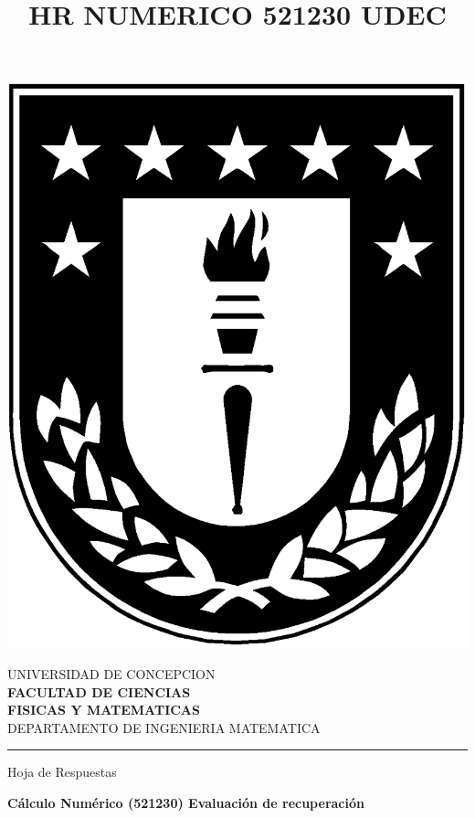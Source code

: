 \documentclass[11pt]{article}
\begin{document}
\title{HR NUMERICO 521230 UDEC}

\vspace*{-3cm}
\hspace{-3cm}
\begin{minipage}{0.12\textwidth}
\includegraphics[width=\textwidth]{logoudec.eps}
\end{minipage}
\hspace{5mm}
\begin{minipage}{0.9\textwidth}
UNIVERSIDAD DE CONCEPCION\\
{\small\small\bf 
FACULTAD DE CIENCIAS\\ 
FISICAS Y MATEMATICAS}\\
DEPARTAMENTO DE INGENIERIA MATEMATICA\\
\end{minipage}

\rule{16cm}{.5pt}

\vspace{0.2cm}
\centerline{\LARGE Hoja de Respuestas}

\vspace{0.1cm}
\centerline{\Large\bf  C\'alculo Num\'erico (521230)  Evaluaci\'on de recuperaci\'on }
\end{document}
